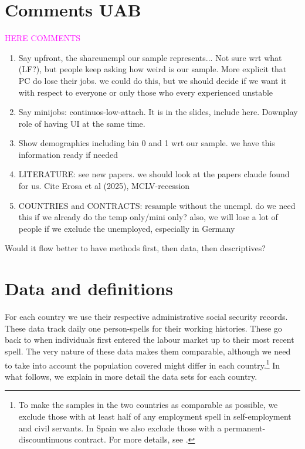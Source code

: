 \documentclass[12pt]{article}
\theoremstyle{definition}
\theoremstyle{remark}
\begin{document}
\section{Comments UAB}

\textcolor{magenta}{HERE COMMENTS}

\begin{enumerate}
    \item Say upfront, the shareunempl our sample represents... Not sure wrt what (LF?), but people keep asking how weird is our sample. More explicit that PC do lose their jobs. we could do this, but we should decide if we want it with respect to everyone or only those who every experienced unstable
     \item Say minijobs: continuos-low-attach. It is in the slides, include here. Downplay role of having UI at the same time.
    \item  ⁠Show demographics including bin 0 and 1 wrt our sample. we have this information ready if needed
\item LITERATURE: see new papers. we should look at the papers claude found for us. Cite Erosa et al (2025), MCLV-recession

\item COUNTRIES and CONTRACTS:⁠  ⁠resample without the unempl. do we need this if we already do the temp only/mini only? also, we will lose a lot of people if we exclude the unemployed, especially in Germany


    
\end{enumerate}

\textcolor{mygreen}{Would it flow better to have methods first, then data, then descriptives?}


\section{Data and definitions}\label{sec:data}

For each country we use their respective administrative social security records.  These data track daily one person-spells 
for their working histories. These go back to when individuals first entered the labour market up to their most recent spell.
The very nature of these data makes them comparable, although we need to take into account the population covered might differ in each country.\footnote{
To make the samples in the two countries as comparable as possible, we exclude those with at least half of any employment spell in self-employment and civil servants.
In Spain we also exclude 
those with a permanent-discountinuous contract. For more details, see \cite*{sodiferentsoalike}.}
In what follows, we explain in more detail the data sets for each country. 
\end{document}

